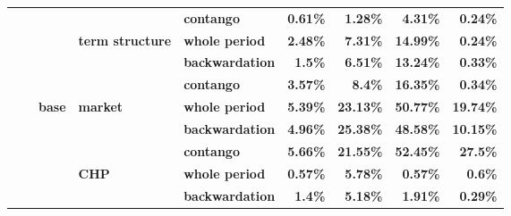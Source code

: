 \documentclass[
  authoryear,
  preprint,
  3p]{elsarticle}
\begin{document}
\begin{longtable}[t]{>{}l>{}l>{}l>{}l>{}l>{}r>{}r>{}r>{}r}
\textbf{} & \textbf{} & \textbf{} & \textbf{} & \textbf{contango} & \textcolor[HTML]{4285f4}{\textbf{0.61\%}} & \textcolor[HTML]{4285f4}{\textbf{1.28\%}} & \textcolor[HTML]{4285f4}{\textbf{4.31\%}} & \textcolor[HTML]{4285f4}{\textbf{0.24\%}}\\
\textbf{} & \textbf{} & \textbf{} & \textbf{term structure} & \textbf{whole period} & \textcolor[HTML]{4285f4}{\textbf{2.48\%}} & \textcolor[HTML]{4285f4}{\textbf{7.31\%}} & \textcolor[HTML]{4285f4}{\textbf{14.99\%}} & \textcolor[HTML]{4285f4}{\textbf{0.24\%}}\\
\textbf{} & \textbf{} & \textbf{} & \textbf{} & \textbf{backwardation} & \textcolor[HTML]{4285f4}{\textbf{1.5\%}} & \textcolor[HTML]{4285f4}{\textbf{6.51\%}} & \textcolor[HTML]{4285f4}{\textbf{13.24\%}} & \textcolor[HTML]{4285f4}{\textbf{0.33\%}}\\
\textbf{} & \textbf{} & \textbf{} & \textbf{} & \textbf{contango} & \textcolor[HTML]{4285f4}{\textbf{3.57\%}} & \textcolor[HTML]{4285f4}{\textbf{8.4\%}} & \textcolor[HTML]{4285f4}{\textbf{16.35\%}} & \textcolor[HTML]{4285f4}{\textbf{0.34\%}}\\
\addlinespace
\textbf{} & \textbf{} & \textbf{base} & \textbf{market} & \textbf{whole period} & \textcolor[HTML]{4285f4}{\textbf{5.39\%}} & \textcolor[HTML]{4285f4}{\textbf{23.13\%}} & \textcolor[HTML]{4285f4}{\textbf{50.77\%}} & \textcolor[HTML]{4285f4}{\textbf{19.74\%}}\\
\textbf{} & \textbf{} & \textbf{} & \textbf{} & \textbf{backwardation} & \textcolor[HTML]{4285f4}{\textbf{4.96\%}} & \textcolor[HTML]{4285f4}{\textbf{25.38\%}} & \textcolor[HTML]{4285f4}{\textbf{48.58\%}} & \textcolor[HTML]{4285f4}{\textbf{10.15\%}}\\
\textbf{} & \textbf{} & \textbf{} & \textbf{} & \textbf{contango} & \textcolor[HTML]{4285f4}{\textbf{5.66\%}} & \textcolor[HTML]{4285f4}{\textbf{21.55\%}} & \textcolor[HTML]{4285f4}{\textbf{52.45\%}} & \textcolor[HTML]{4285f4}{\textbf{27.5\%}}\\
\textbf{} & \textbf{} & \textbf{} & \textbf{CHP} & \textbf{whole period} & \textcolor[HTML]{4285f4}{\textbf{0.57\%}} & \textcolor[HTML]{4285f4}{\textbf{5.78\%}} & \textcolor[HTML]{4285f4}{\textbf{0.57\%}} & \textcolor[HTML]{4285f4}{\textbf{0.6\%}}\\
\textbf{} & \textbf{} & \textbf{} & \textbf{} & \textbf{backwardation} & \textcolor[HTML]{4285f4}{\textbf{1.4\%}} & \textcolor[HTML]{4285f4}{\textbf{5.18\%}} & \textcolor[HTML]{4285f4}{\textbf{1.91\%}} & \textcolor[HTML]{4285f4}{\textbf{0.29\%}}\\

\end{longtable}
\end{document}
